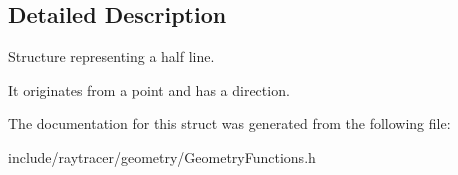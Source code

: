 \subsection{Detailed Description}
Structure representing a half line. 

It originates from a point and has a direction. 

The documentation for this struct was generated from the following file\+:\begin{DoxyCompactItemize}
\item 
include/raytracer/geometry/Geometry\+Functions.\+h\end{DoxyCompactItemize}
